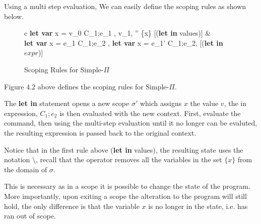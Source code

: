 \documentclass[a4paper,12pt]{report}
\begin{document}
\par
Using a multi step evaluation, We can easily define the scoping rules as shown 
below.
  
\begin{figure}[H]
  \begin{center}
    \begin{tabular}{c}
      {\langle\textbf{let var }x = v_0  C_1;e_1 , \sigma \rangle 
      \Longrightarrow \langle v_1, \sigma'' \setminus \{x\} \rangle} [(\textbf{let in} values)] 
      & \\
      {\langle \textbf{let var }x = e_1  C_1;e_2 , \sigma \rangle 
      \Longrightarrow \langle\textbf{let var }x = e_1'  C_1;e_2, \sigma \rangle} 
      [(\textbf{let in} $expr$)]
    \end{tabular}
  \end{center}
  \caption{Scoping Rules for Simple-$\Pi$}
\end{figure}

\par
Figure 4.2 above defines the scoping rules for Simple-$\Pi$.

\par
The \textbf{let in} statement opens a new scope $\sigma'$ which 
assigns $x$ the value $v$, the in expression, $C_1;e_2$ is then evaluated with the 
new context. First, evaluate the command, then using the multi-step 
evaluation until it no longer can be evaluted, the resulting expression is 
passed back to the original context.

\par 
Notice that in the first rule above (\textbf{let in } values), the resulting state 
uses the notation $\setminus$, recall that the operator removes all the variables 
in the set $\{x\}$ from the domain of $\sigma$. 

\par
This is necessary as in a scope it is possible to change the state of the 
program. More importantly, upon exiting a scope the alteration to the program 
will still hold, the only difference is that the variable $x$ is no longer in 
the state, i.e. has ran out of scope.
\end{document}
